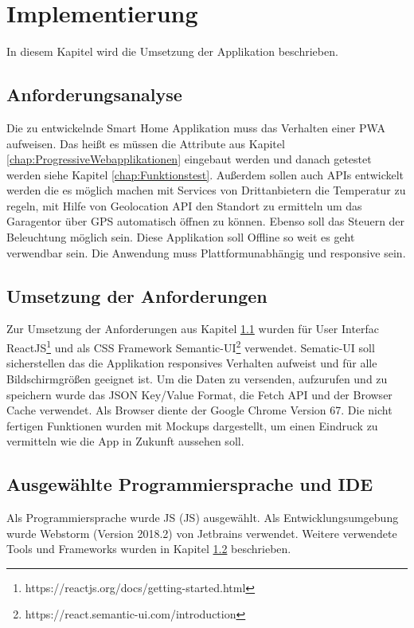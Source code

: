 \chapter{Implementierung}\label{chap:Implementierung}
\thispagestyle{standard}
\pagestyle{standard}

In diesem Kapitel wird die Umsetzung der Applikation beschrieben.

\section{Anforderungsanalyse}\label{sub:Anforderungsanalyse}
Die zu entwickelnde Smart Home Applikation muss das Verhalten einer \acs{PWA} aufweisen. Das heißt es müssen die Attribute aus Kapitel \ref{chap:ProgressiveWebapplikationen} eingebaut werden und danach getestet werden siehe Kapitel \ref{chap:Funktionstest}. Außerdem sollen auch APIs entwickelt werden die es möglich machen mit Services von Drittanbietern die Temperatur zu regeln, mit Hilfe von Geolocation API den Standort zu ermitteln um das Garagentor über GPS automatisch öffnen zu können. Ebenso soll das Steuern der Beleuchtung möglich sein. Diese Applikation soll Offline so weit es geht verwendbar sein. Die Anwendung muss Plattformunabhängig und responsive sein.

\section{Umsetzung der Anforderungen}\label{sub:Umsetzung der Anforderungen}
Zur Umsetzung der Anforderungen aus Kapitel \ref{sub:Anforderungsanalyse} wurden für  User Interfac ReactJS\footnote{https://reactjs.org/docs/getting-started.html} und als CSS Framework Semantic-UI\footnote{https://react.semantic-ui.com/introduction} verwendet. Sematic-UI soll sicherstellen das die Applikation responsives Verhalten aufweist und für alle Bildschirmgrößen geeignet ist. Um die Daten zu versenden, aufzurufen und zu speichern wurde das JSON Key/Value Format, die Fetch API und der Browser Cache verwendet.
Als Browser diente der Google Chrome Version 67.
Die nicht fertigen Funktionen wurden mit Mockups dargestellt, um einen Eindruck zu vermitteln wie die App in Zukunft aussehen soll.

\section{Ausgewählte Programmiersprache und IDE}
Als Programmiersprache wurde \acl{JS} (\acs{JS}) ausgewählt. 
Als Entwicklungsumgebung wurde Webstorm (Version 2018.2) von Jetbrains verwendet. 
Weitere verwendete Tools und Frameworks wurden in Kapitel \ref{sub:Umsetzung der Anforderungen} beschrieben.
\newpage
